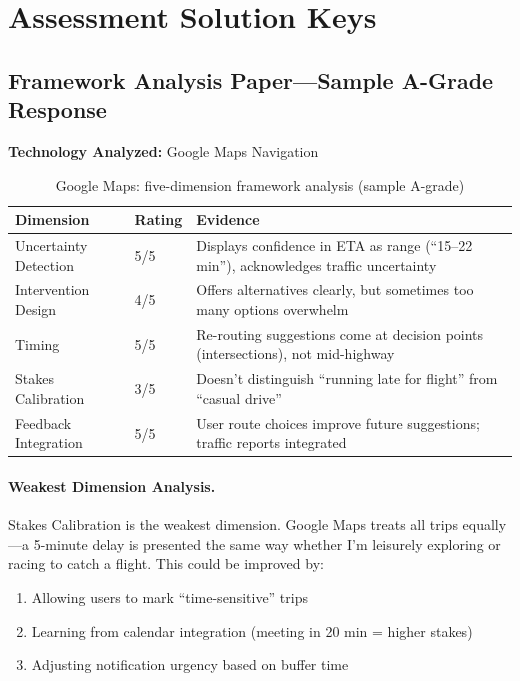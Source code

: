 \section{Assessment Solution Keys}

\subsection{Framework Analysis Paper---Sample A-Grade Response}

\textbf{Technology Analyzed:} Google Maps Navigation

\begin{table}[htbp]
\caption{Google Maps: five-dimension framework analysis (sample A-grade)}
\label{tab:google-maps-analysis}
\centering
\begin{tabular}{@{}p{3.5cm}p{1.5cm}p{7cm}@{}}
\toprule
\textbf{Dimension} & \textbf{Rating} & \textbf{Evidence} \\
\midrule
Uncertainty Detection & 5/5 & Displays confidence in ETA as range (``15--22 min''), acknowledges traffic uncertainty \\
Intervention Design & 4/5 & Offers alternatives clearly, but sometimes too many options overwhelm \\
Timing & 5/5 & Re-routing suggestions come at decision points (intersections), not mid-highway \\
Stakes Calibration & 3/5 & Doesn't distinguish ``running late for flight'' from ``casual drive'' \\
Feedback Integration & 5/5 & User route choices improve future suggestions; traffic reports integrated \\
\bottomrule
\end{tabular}
\end{table}

\paragraph{Weakest Dimension Analysis.}

Stakes Calibration is the weakest dimension. Google Maps treats all trips equally---a 5-minute delay is presented the same way whether I'm leisurely exploring or racing to catch a flight. This could be improved by:
\begin{enumerate}
    \item Allowing users to mark ``time-sensitive'' trips
    \item Learning from calendar integration (meeting in 20 min = higher stakes)
    \item Adjusting notification urgency based on buffer time
\end{enumerate}

